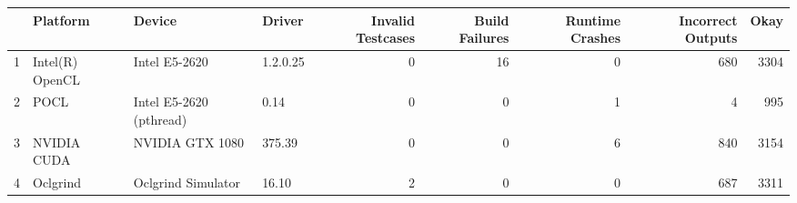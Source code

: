 \begin{tabular}{llllrrrrr}
\toprule
{} &         Platform &                   Device &    Driver &  Invalid Testcases &  Build Failures &  Runtime Crashes &  Incorrect Outputs &  Okay \\
\midrule
1 &  Intel(R) OpenCL &            Intel E5-2620 &  1.2.0.25 &                  0 &              16 &                0 &                680 &  3304 \\
2 &             POCL &  Intel E5-2620 (pthread) &      0.14 &                  0 &               0 &                1 &                  4 &   995 \\
3 &      NVIDIA CUDA &          NVIDIA GTX 1080 &    375.39 &                  0 &               0 &                6 &                840 &  3154 \\
4 &         Oclgrind &       Oclgrind Simulator &     16.10 &                  2 &               0 &                0 &                687 &  3311 \\
\bottomrule
\end{tabular}
